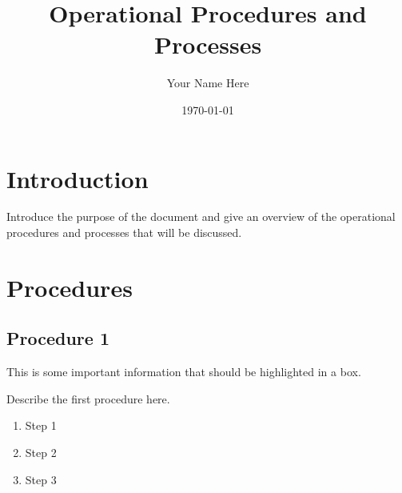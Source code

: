 \documentclass{article}
\begin{document}
\title{Operational Procedures and Processes}
\author{Your Name Here}
\date{\today}

\maketitle

\tableofcontents

\section{Introduction}
Introduce the purpose of the document and give an overview of the operational procedures and processes that will be discussed.

\section{Procedures}

\subsection{Procedure 1}

\begin{tcolorbox}[colback=yellow!10!white,colframe=yellow!70!black,title=Important Note]
    This is some important information that should be highlighted in a box.
\end{tcolorbox}

Describe the first procedure here.
\begin{enumerate}[label=\alph*.]
    \item Step 1
    \item Step 2
    \item Step 3
\end{enumerate}

\newpage    
\end{document}
